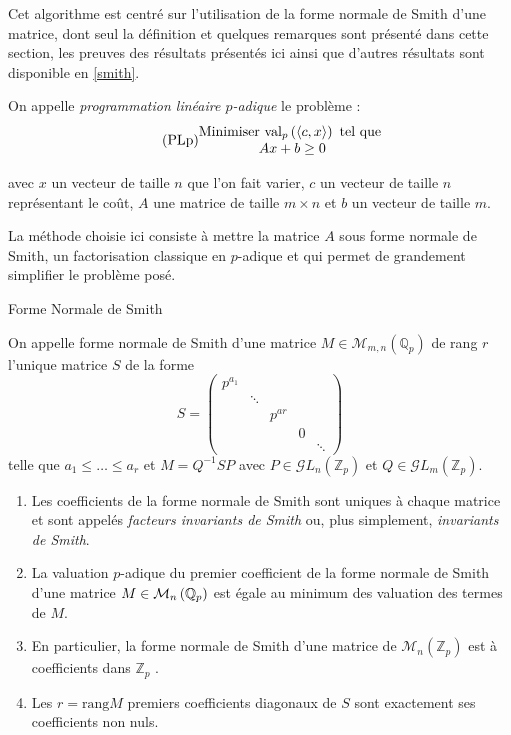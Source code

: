 	Cet algorithme est centré sur l'utilisation de la forme normale de Smith d'une matrice, dont seul la définition et quelques remarques sont présenté dans cette section, les preuves des résultats présentés ici ainsi que d'autres résultats sont disponible en \ref{smith}.

	On appelle \textit{programmation linéaire $p$-adique} le problème :
\begin{equation}
	  \tag{PLp}
\begin{matrix}
	\text{Minimiser } \text{val}_p\left(\left<c,x \right>\right) \text{ tel que }\\
	Ax + b \ge 0
 \end{matrix}
	    \label{eqn:Proglinp}
\end{equation}

avec $x$ un vecteur de taille $n$ que l'on fait varier, $c$ un vecteur de taille $n$ représentant le coût, $A$ une matrice de taille $m \times n $ et $b$ un vecteur de taille $m$.

La méthode choisie ici consiste à mettre la matrice $A$ sous forme normale de Smith, un factorisation classique en $p$-adique et qui permet de grandement simplifier le problème posé.

\begin{definition}
	Forme Normale de Smith

		On appelle forme normale de Smith d'une matrice $M \in \mathcal{M}_{m,n}\left(\mathbb{Q}_{p} \right) $ de rang $r$ l'unique matrice $S$ de la forme $$S =  
	\begin{pmatrix} p^{a_1} & \\
		 & \ddots \\
		 & & p^{ar}\\
		 & & & 0\\
		 & & & & \ddots \end{pmatrix} $$
		 telle que $a_1\le  \ldots\le a_r$ et $M =  Q^{-1} S P$ avec $P \in \mathcal{G}L_n\left( \mathbb{Z}_p \right) $ et $Q \in \mathcal{G}L_m\left( \mathbb{Z}_p \right) $.
\end{definition}

\begin{remarques}

	
	\begin{enumerate}[label=\roman*.]
		\item Les coefficients de la forme normale de Smith sont uniques à chaque matrice et sont appelés \textit{facteurs invariants de Smith} ou, plus simplement, \textit{invariants de Smith}.
		\item La valuation $p$-adique du premier coefficient de la forme normale de Smith d'une matrice $M \in \mathcal{M}_n \left( \mathbb{Q}_p \right) $ est égale au minimum des valuation des termes de $M$.
		\item En particulier, la forme normale de Smith d'une matrice de $\mathcal{M}_n \left( \mathbb{Z}_p \right) $ est à coefficients dans $\mathbb{Z}_p$ .
		\item Les $r = \text{rang} M$ premiers coefficients diagonaux de $S$ sont exactement ses coefficients non nuls.  
	\end{enumerate}

\end{remarques}


